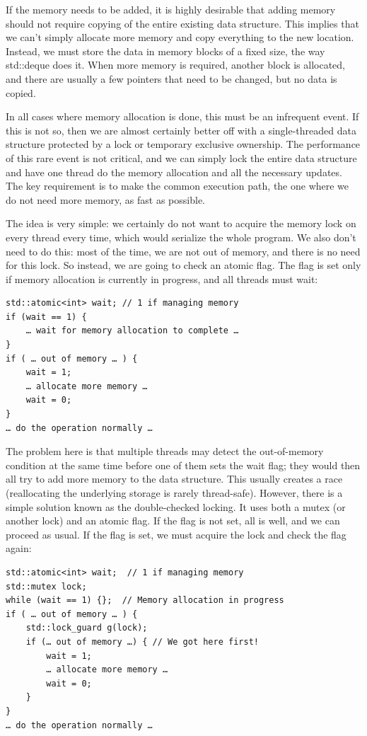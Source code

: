 If the memory needs to be added, it is highly desirable that adding memory should not require copying of the entire existing data structure. This implies that we can't simply allocate more memory and copy everything to the new location. Instead, we must store the data in memory blocks of a fixed size, the way std::deque does it. When more memory is required, another block is allocated, and there are usually a few pointers that need to be changed, but no data is copied. 

In all cases where memory allocation is done, this must be an infrequent event. If this is not so, then we are almost certainly better off with a single-threaded data structure protected by a lock or temporary exclusive ownership. The performance of this rare event is not critical, and we can simply lock the entire data structure and have one thread do the memory allocation and all the necessary updates. The key requirement is to make the common execution path, the one where we do not need more memory, as fast as possible. 

The idea is very simple: we certainly do not want to acquire the memory lock on every thread every time, which would serialize the whole program. We also don't need to do this: most of the time, we are not out of memory, and there is no need for this lock. So instead, we are going to check an atomic flag. The flag is set only if memory allocation is currently in progress, and all threads must wait:

\begin{lstlisting}[style=styleCXX]
std::atomic<int> wait; // 1 if managing memory
if (wait == 1) {
	… wait for memory allocation to complete …
}
if ( … out of memory … ) {
	wait = 1;
	… allocate more memory …
	wait = 0;
}
… do the operation normally … 
\end{lstlisting}

The problem here is that multiple threads may detect the out-of-memory condition at the same time before one of them sets the wait flag; they would then all try to add more memory to the data structure. This usually creates a race (reallocating the underlying storage is rarely thread-safe). However, there is a simple solution known as the double-checked locking. It uses both a mutex (or another lock) and an atomic flag. If the flag is not set, all is well, and we can proceed as usual. If the flag is set, we must acquire the lock and check the flag again:

\begin{lstlisting}[style=styleCXX]
std::atomic<int> wait;  // 1 if managing memory
std::mutex lock;
while (wait == 1) {};  // Memory allocation in progress
if ( … out of memory … ) {
	std::lock_guard g(lock);
	if (… out of memory …) { // We got here first!
		wait = 1;
		… allocate more memory …
		wait = 0;
	}
}
… do the operation normally …
\end{lstlisting}


